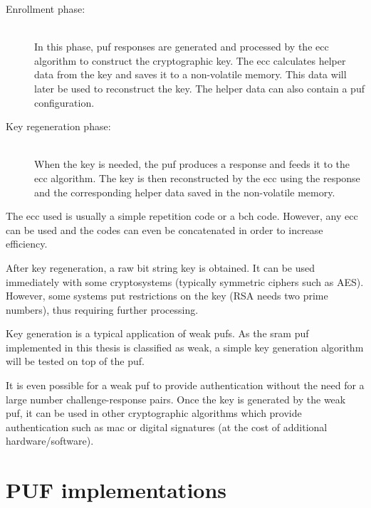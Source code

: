 \begin{description}
    \item[Enrollment phase:] \hfill \\ In this phase, \gls{puf} responses are generated and processed by the \gls{ecc} algorithm to construct the cryptographic key. The \gls{ecc} calculates helper data from the key and saves it to a non-volatile memory. This data will later be used to reconstruct the key. The helper data can also contain a \gls{puf} configuration.
    \item[Key regeneration phase:] \hfill \\ When the key is needed, the \gls{puf} produces a response and feeds it to the \gls{ecc} algorithm. The key is then reconstructed by the \gls{ecc} using the response and the corresponding helper data saved in the non-volatile memory.
\end{description}

The \gls{ecc} used is usually a simple repetition code or a \gls{bch} code. However, any \gls{ecc} can be used and the codes can even be concatenated in order to increase efficiency.\cite{Bosch2008}

After key regeneration, a raw bit string key is obtained. It can be used immediately with some cryptosystems (typically symmetric ciphers such as AES). However, some systems put restrictions on the key (RSA needs two prime numbers), thus requiring further processing. %

Key generation is a typical application of weak \glspl{puf}\cite{Herder2014}. As the \gls{sram} \gls{puf} implemented in this thesis is classified as weak, a simple key generation algorithm will be tested on top of the \gls{puf}.

It is even possible for a weak \gls{puf} to provide authentication without the need for a large number challenge-response pairs. Once the key is generated by the weak \gls{puf}, it can be used in other cryptographic algorithms which provide authentication such as \gls{mac} or digital signatures (at the cost of additional hardware/software).\cite{Herder2014}



\section{PUF implementations}

